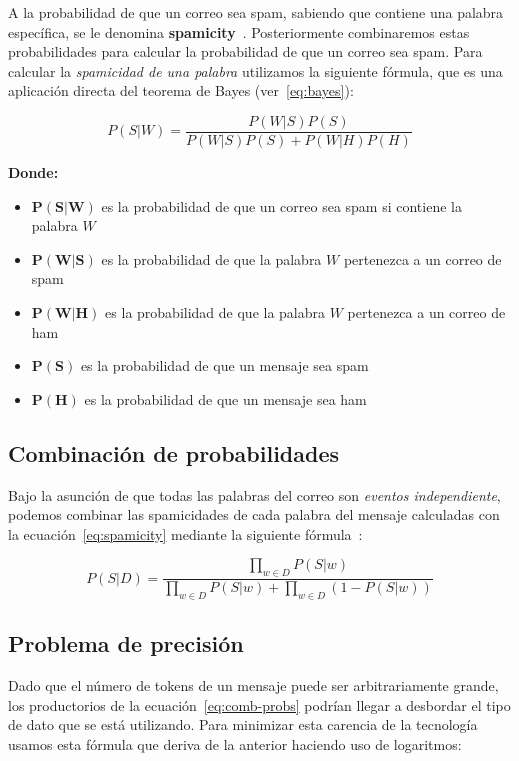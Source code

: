 A la probabilidad de que un correo sea spam, sabiendo que contiene una palabra
específica, se le denomina \textbf{spamicity}~\cite{eberhardt2015bayesian}.
Posteriormente combinaremos estas probabilidades para calcular la probabilidad
de que un correo sea spam. Para calcular la \textit{spamicidad de una palabra}
utilizamos la siguiente fórmula, que es una aplicación directa del teorema de
Bayes (ver~\ref{eq:bayes}):

\begin{equation}
	\label{eq:spamicity}
	P(S | W) = \frac{P(W | S) P(S)}{P(W | S) P(S) + P(W | H) P(H)}
\end{equation}

\textbf{Donde:}
\begin{itemize}
	\item $\bm{P(S | W)}$ es la probabilidad de que un correo sea spam si contiene la palabra $W$
	\item $\bm{P(W | S)}$ es la probabilidad de que la palabra $W$ pertenezca a un correo de spam
	\item $\bm{P(W | H)}$ es la probabilidad de que la palabra $W$ pertenezca a un correo de ham
	\item $\bm{P(S)}$ es la probabilidad de que un mensaje sea spam
	\item $\bm{P(H)}$ es la probabilidad de que un mensaje sea ham
\end{itemize}

\subsection{Combinación de probabilidades}

Bajo la asunción de que todas las palabras del correo son \textit{eventos
independiente}, podemos combinar las spamicidades de cada palabra del mensaje
calculadas con la ecuación~\ref{eq:spamicity} mediante la siguiente
fórmula~\cite{graham2003probability}:

\begin{equation}
	\label{eq:comb-probs}
	P(S|D) = \frac{\displaystyle\prod_{w \in D}{P(S|w)}}{\displaystyle\prod_{w \in D}{P(S|w)} + \displaystyle\prod_{w \in D}{\left(1 - P(S|w)\right)}}
\end{equation}

\subsection{Problema de precisión}

Dado que el número de tokens de un mensaje puede ser arbitrariamente grande, los
productorios de la ecuación~\ref{eq:comb-probs} podrían llegar a desbordar el
tipo de dato que se está utilizando. Para minimizar esta carencia de la
tecnología usamos esta fórmula que deriva de la anterior haciendo uso de
logaritmos:

